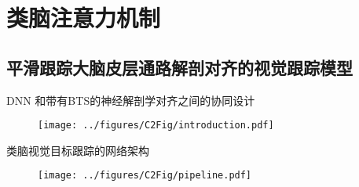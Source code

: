 \section{类脑注意力机制}
\subsection{平滑跟踪大脑皮层通路解剖对齐的视觉跟踪模型}


\begin{frame}{DNN 和带有BTS的神经解剖学对齐之间的协同设计}
	\begin{figure}[!t]
		\centering
		\texttt{[image: ../figures/C2Fig/introduction.pdf]}
		\label{ch2_introduction}
	\end{figure}
\end{frame}


\begin{frame}{类脑视觉目标跟踪的网络架构}
	\begin{figure}[!t]
		\centering
		\texttt{[image: ../figures/C2Fig/pipeline.pdf]}
		\label{ch2_pipeline}
	\end{figure}
\end{frame}



